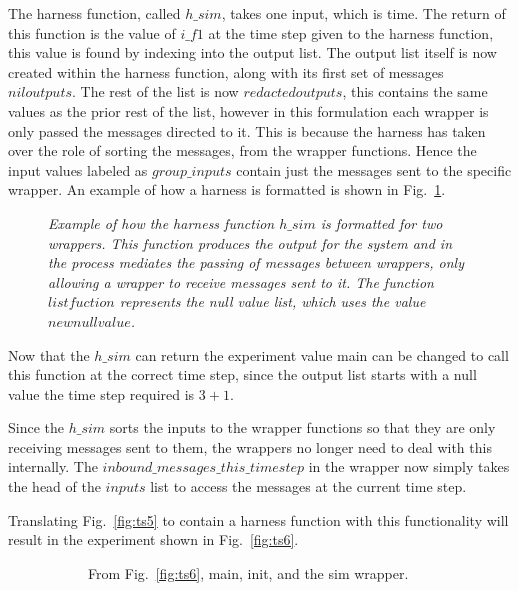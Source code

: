 \documentclass{article}
\begin{document}
The harness function, called $h\_sim$, takes one input, which is time. The return of this function is the value of $i\_f1$ at the time step given to the harness function, this value is found by indexing into the output list. The output list itself is now created within the harness function, along with its first set of messages $niloutputs$. The rest of the list is now $redactedoutputs$, this contains the same values as the prior rest of the list, however in this formulation each wrapper is only passed the messages directed to it. This is because the harness has taken over the role of sorting the messages, from the wrapper functions. Hence the input values labeled as $group\_inputs$ contain just the messages sent to the specific wrapper. An example of how a harness is formatted is shown in Fig.~\ref{fig:harn6}.
\begin{figure}[H]
	\centering
	
	\caption{\it Example of how the harness function $h\_sim$ is formatted for two wrappers. This function produces the output for the system and in the process mediates the passing of messages between wrappers, only allowing a wrapper to receive messages sent to it. The function $listfuction$ represents the null value list, which uses the value $newnullvalue$.  }
	\label{fig:harn6}
\end{figure} 

Now that the $h\_sim$ can return the experiment value main can be changed to call this function at the correct time step, since the output list starts with a null value the time step required is $3+1$. 

Since the $h\_sim$ sorts the inputs to the wrapper functions so that they are only receiving messages sent to them, the wrappers no longer need to deal with this internally. The $inbound\_messages\_this\_timestep$ in the wrapper now simply takes the head of the $inputs$ list to access the messages at the current time step. 

Translating Fig.~\ref{fig:ts5} to contain a harness function with this functionality will result in the experiment shown in Fig.~\ref{fig:ts6}.
\begin{figure}[H]
	\centering
	\begin{subfigure}[b]{1\textwidth}
	
	\caption{From Fig.~\ref{fig:ts6}, main, init, and the sim wrapper.  }
        \label{fig:ts61}
	\end{subfigure}
	\caption*{}
\end{figure}
	
\end{document}
